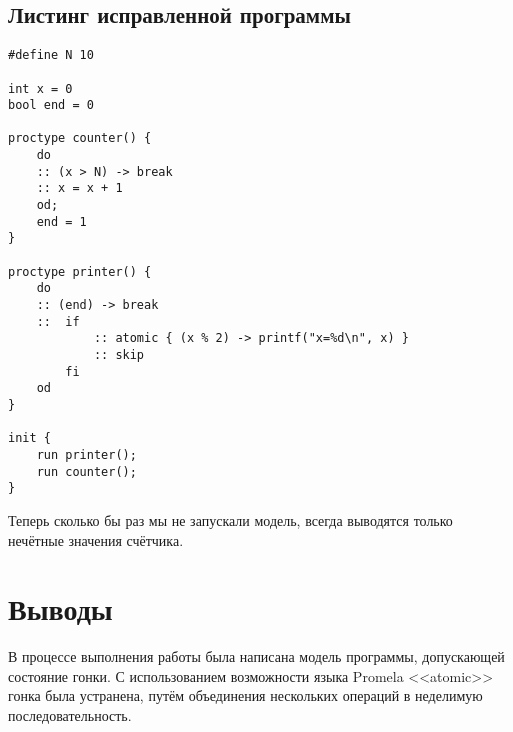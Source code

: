 \documentclass[a4paper,12pt]{report}
\begin{document}
\subsection*{Листинг исправленной программы}
\begin{Verbatim}
#define N 10

int x = 0
bool end = 0

proctype counter() {
    do
    :: (x > N) -> break
    :: x = x + 1
    od;
    end = 1
}

proctype printer() {
    do
    :: (end) -> break
    ::  if
            :: atomic { (x % 2) -> printf("x=%d\n", x) }
            :: skip
        fi
    od
}

init {
    run printer();
    run counter();
}
\end{Verbatim}

Теперь сколько бы раз мы не запускали модель, всегда выводятся только нечётные значения счётчика.

\section*{Выводы}

В процессе выполнения работы была написана модель программы, допускающей состояние гонки. С использованием возможности языка Promela <<atomic>> 
гонка была устранена, путём объединения нескольких операций в неделимую последовательность.
\end{document}

